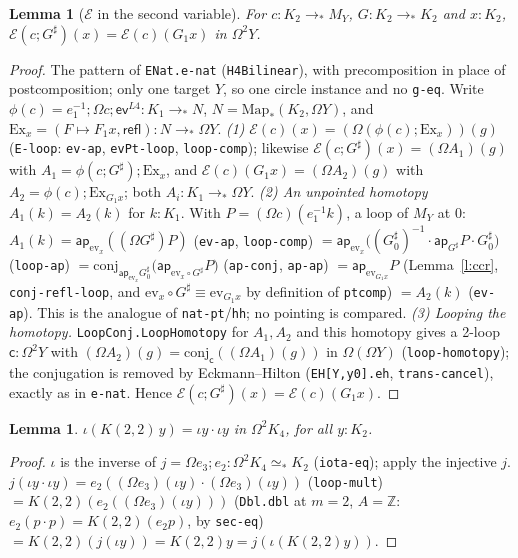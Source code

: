 \documentclass[11pt]{amsart}
\newtheorem{lemma}[theorem]{Lemma}
\theoremstyle{definition}
\theoremstyle{remark}
\newcommand{\Om}{\Omega}
\newcommand{\Map}{\mathrm{Map}_*}
\newcommand{\Z}{\mathbb{Z}}
\newcommand{\code}[1]{\texttt{#1}}
\newcommand{\refl}{\mathsf{refl}}
\newcommand{\ap}{\mathsf{ap}}
\newcommand{\lp}{\Omega}
\newcommand{\cE}{\mathcal E}
\newcommand{\cj}{\mathrm{conj}}
\begin{document}
\begin{lemma}[$\cE$ in the second variable]\label{l:Epre}
For $c:K_2\to_*M_Y$, $G:K_2\to_*K_2$ and $x:K_2$, $\cE(c;G^\sharp)(x)=\cE(c)(G_1x)$
in $\Om^2Y$.
\end{lemma}
\begin{proof}
The pattern of \code{ENat.e-nat} (\code{H4Bilinear}), with precomposition in place
of postcomposition; only one target $Y$, so one circle instance and no
\code{g-eq}. Write $\phi(c)=e_1^{-1};\lp c;\mathsf{ev}^{L4}:K_1\to_*N$,
$N=\Map(K_2,\Om Y)$, and $\mathrm{Ex}_x=(F\mapsto F_1x,\refl):N\to_*\Om Y$.
\emph{(1)} $\cE(c)(x)=(\lp(\phi(c);\mathrm{Ex}_x))(g)$ (\code{E-loop}: \code{ev-ap},
\code{evPt-loop}, \code{loop-comp}); likewise
$\cE(c;G^\sharp)(x)=(\lp A_1)(g)$ with $A_1=\phi(c;G^\sharp);\mathrm{Ex}_x$, and
$\cE(c)(G_1x)=(\lp A_2)(g)$ with $A_2=\phi(c);\mathrm{Ex}_{G_1x}$; both $A_i:K_1\to_*\Om Y$.
\emph{(2) An unpointed homotopy} $A_1(k)=A_2(k)$ for $k:K_1$. With
$P=(\lp c)(e_1^{-1}k)$, a loop of $M_Y$ at $0$:
$A_1(k)=\ap_{\mathrm{ev}_x}((\lp G^\sharp)P)$ (\code{ev-ap}, \code{loop-comp})
$=\ap_{\mathrm{ev}_x}\bigl((G^\sharp_0)^{-1}\cdot\ap_{G^\sharp}P\cdot G^\sharp_0\bigr)$
(\code{loop-ap}) $=\cj_{\ap_{\mathrm{ev}_x}G^\sharp_0}\bigl(\ap_{\mathrm{ev}_x\circ G^\sharp}P\bigr)$
(\code{ap-conj}, \code{ap-ap}) $=\ap_{\mathrm{ev}_{G_1x}}P$ (Lemma~\ref{l:ccr},
\code{conj-refl-loop}, and $\mathrm{ev}_x\circ G^\sharp\equiv\mathrm{ev}_{G_1x}$ by
definition of \code{ptcomp}) $=A_2(k)$ (\code{ev-ap}). This is the analogue of
\code{nat-pt}/\code{hh}; no pointing is compared.
\emph{(3) Looping the homotopy.} \code{LoopConj.LoopHomotopy} for $A_1,A_2$ and
this homotopy gives a 2-loop $\mathsf c:\Om^2Y$ with
$(\lp A_2)(g)=\cj_{\mathsf c}((\lp A_1)(g))$ in $\Om(\Om Y)$ (\code{loop-homotopy}); the conjugation is
removed by Eckmann--Hilton (\code{EH[Y,y0].eh}, \code{trans-cancel}), exactly as
in \code{e-nat}. Hence $\cE(c;G^\sharp)(x)=\cE(c)(G_1x)$.
\end{proof}

\begin{lemma}\label{l:iota2}
$\iota(K(2,2)\,y)=\iota y\cdot\iota y$ in $\Om^2K_4$, for all $y:K_2$.
\end{lemma}
\begin{proof}
$\iota$ is the inverse of $j=\lp e_3;e_2:\Om^2K_4\simeq_*K_2$
(\code{iota-eq}); apply the injective $j$. $j(\iota y\cdot\iota y)=
e_2((\lp e_3)(\iota y)\cdot(\lp e_3)(\iota y))$ (\code{loop-mult})
$=K(2,2)(e_2((\lp e_3)(\iota y)))$ (\code{Dbl.dbl} at $m=2$, $A=\Z$:
$e_2(p\cdot p)=K(2,2)(e_2p)$, by \code{sec-eq})
$=K(2,2)(j(\iota y))=K(2,2)y=j(\iota(K(2,2)y))$.
\end{proof}
\end{document}
